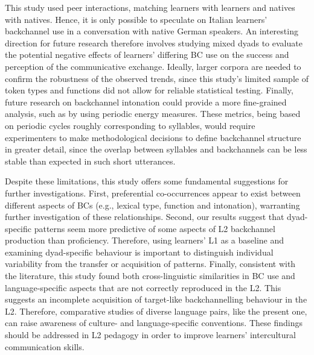This study used peer interactions, matching learners with learners and natives with natives. Hence, it is only possible to speculate on Italian learners’ backchannel use in a conversation with native German speakers. An interesting direction for future research therefore involves studying mixed dyads to evaluate the potential negative effects of learners’ differing BC use on the success and perception of the communicative exchange. Ideally, larger corpora are needed to confirm the robustness of the observed trends, since this study’s limited sample of token types and functions did not allow for reliable statistical testing. Finally, future research on backchannel intonation could provide a more fine-grained analysis, such as by using periodic energy measures. These metrics, being based on periodic cycles roughly corresponding to syllables, would require experimenters to make methodological decisions to define backchannel structure in greater detail, since the overlap between syllables and backchannels can be less stable than expected in such short utterances.

Despite these limitations, this study offers some fundamental suggestions for further investigations. First, preferential co-occurrences appear to exist between different aspects of BCs (e.g., lexical type, function and intonation), warranting further investigation of these relationships. Second, our results suggest that dyad-specific patterns seem more predictive of some aspects of L2 backchannel production than proficiency. Therefore, using learners’ L1 as a baseline and examining dyad-specific behaviour is important to distinguish individual variability from the transfer or acquisition of patterns. Finally, consistent with the literature, this study found both cross-linguistic similarities in BC use and language-specific aspects that are not correctly reproduced in the L2. This suggests an incomplete acquisition of target-like backchannelling behaviour in the L2. Therefore, comparative studies of diverse language pairs, like the present one, can raise awareness of culture- and language-specific conventions. These findings should be addressed in L2 pedagogy in order to improve learners’ intercultural communication skills.

